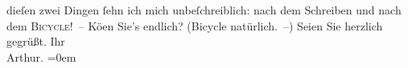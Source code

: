 \begin{ledgroupsized}[t]{13cm}
               dieſen zwei Dingen ſehn ich mich unbeſchreiblich: nach dem Schreiben und nach dem \textsc{Bicycle}! – Kö{\geminationn}en Sie’s endlich?
               (Bicycle natürlich. –)\pend
           \pstart
           Seien Sie herzlich gegrüßt. Ihr{\\[\baselineskip]}\spacefill\mbox{Arthur.}\pend
           \leftskip=0em{}\endnumbering{}\end{ledgroupsized}  \newcommand{\dateiname}{L00678}\newcommand{\titel}{Arthur Schnitzler an Richard Beer-Hofmann, 20. 5. 1897}\newcommand{\editorInnen}{ Martin Anton Müller und Gerd-Hermann Susen}
            \footnotesize
\begin{ledgroupsized}[t]{11.5cm}
\end{ledgroupsized}
         
      